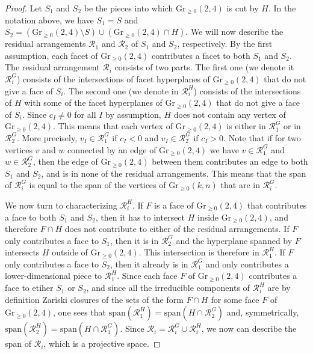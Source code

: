 \documentclass[12pt]{extarticle}
\theoremstyle{definition}
\begin{document}
\begin{proof}
    Let $S_1$ and $S_2$ be the pieces into which $\mathrm{Gr}_{\geq 0}(2,4)$ is cut by $H$. In the notation above, we have $S_1 = S$ and $S_2 = (\mathrm{Gr}_{\geq 0}(2,4) \setminus S) \cup (\mathrm{Gr}_{\geq 0}(2,4) \cap H)$. We will now describe the residual arrangements $\mathcal{R}_1$ and $\mathcal{R}_2$ of $S_1$ and $S_2$, respectively. By the first assumption, each facet of $\mathrm{Gr}_{\geq 0}(2,4)$ contributes a facet to both $S_1$ and $S_2$. The residual arrangement $\mathcal{R}_i$ consists of two parts. The first one (we denote it $\mathcal{R}^G_i$) consists of the intersections of facet hyperplanes of $\mathrm{Gr}_{\geq 0}(2,4)$ that do not give a face of $S_i$. The second one (we denote in $\mathcal{R}^H_i$) consists of the intersections of $H$ with some of the facet hyperplanes of $\mathrm{Gr}_{\geq 0}(2,4)$ that do not give a face of $S_i$. Since $c_I\neq 0$ for all $I$ by assumption, $H$ does not contain any vertex of $\mathrm{Gr}_{\geq 0}(2,4)$. This means that each vertex of $\mathrm{Gr}_{\geq 0}(2,4)$ is either in $\mathcal{R}^G_{1}$ or in $\mathcal{R}^G_2$. More precisely, $v_I \in \mathcal{R}^G_{1}$ if $c_I <0$ and $v_I \in \mathcal{R}^G_2$ if $c_I > 0$. Note that if for two vertices $v$ and $w$ connected by an edge of $\mathrm{Gr}_{\geq 0}(2,4)$ we have $v \in \mathcal{R}^G_{1}$ and $w \in \mathcal{R}^G_2$, then the edge of $\mathrm{Gr}_{\geq 0}(2,4)$ between them contributes an edge to both $S_1$ and $S_2$, and is in none of the residual arrangements. This means that the span of $\mathcal{R}^G_i$ is equal to the span of the vertices of $\mathrm{Gr}_{\geq 0}(k,n)$ that are in $\mathcal{R}^G_i$. 

We now turn to characterizing $\mathcal{R}^H_i$. If $F$ is a face of $\mathrm{Gr}_{\geq 0}(2,4)$ that contributes a face to both $S_1$ and $S_2$, then it has to intersect $H$ inside $\mathrm{Gr}_{\geq 0}(2,4)$, and therefore $F\cap H$ does not contribute to either of the residual arrangements. If $F$ only contributes a face to $S_1$, then it is in $\mathcal{R}^G_2$ and the hyperplane spanned by $F$ intersects $H$ outside of $\mathrm{Gr}_{\geq 0}(2,4)$. This intersection is therefore in $\mathcal{R}^H_1$. If $F$ only contributes a face to $S_2$, then it already is in $\mathcal{R}^G_1$ and only contributes a lower-dimensional piece to $\mathcal{R}^H_1$. Since each face $F$ of $\mathrm{Gr}_{\geq 0}(2,4)$ contributes a face to etiher $S_1$ or $S_2$, and since all the irreducible components of $\mathcal{R}_i^H$ are by definition Zariski closures of the sets of the form $F \cap H$ for some face $F$ of $\mathrm{Gr}_{\geq 0}(2,4)$, one sees that $\mathrm{span}(\mathcal{R}^H_1) = \mathrm{span}(H\cap \mathcal{R}^G_2)$ and, symmetrically, $\mathrm{span}(\mathcal{R}^H_2) = \mathrm{span}(H\cap \mathcal{R}^G_1)$. Since $\mathcal{R}_i = \mathcal{R}_i^G \cup \mathcal{R}_i^H$, we now can describe the span of $\mathcal{R}_i$, which is a projective space.


\end{proof}
\end{document}
